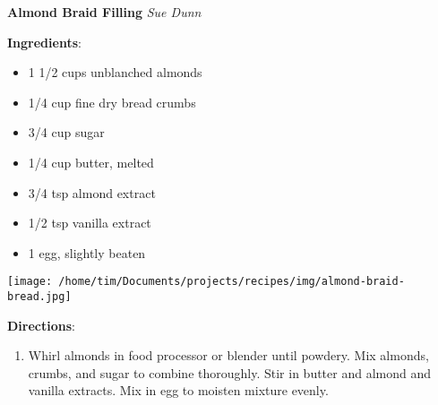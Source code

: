 \documentclass[11pt, twoside, openany]{book}
\begin{document}
\noindent\begin{minipage}[t]{\linewidth}%
{\Large\textbf{Almond Braid Filling}} \label{almond-braid-filling}\hfill\textit{Sue Dunn}\\
\noindent\begin{minipage}[t]{0.78\linewidth}%
\textbf{Ingredients}:\vspace{-3mm}
\begin{multicols}{2}
\begin{itemize}\setlength\itemsep{-1mm}
\item 1 1/2 cups unblanched almonds
\item 1/4 cup fine dry bread crumbs
\item 3/4 cup sugar
\item 1/4 cup butter, melted
\item 3/4 tsp almond extract
\item 1/2 tsp vanilla extract
\item 1 egg, slightly beaten
\end{itemize}
\end{multicols}
\end{minipage}
\noindent\begin{minipage}[t]{0.18\linewidth}
\centering \strut\vspace*{-\baselineskip}\newline
\texttt{[image: /home/tim/Documents/projects/recipes/img/almond-braid-bread.jpg]}\\
\end{minipage}\vspace{3mm}
\textbf{Directions}:
\vspace{-3mm}\begin{enumerate}\setlength\itemsep{-1mm}
\item Whirl almonds in food processor or blender until powdery. Mix almonds, crumbs, and sugar to combine thoroughly. Stir in butter and almond and vanilla extracts. Mix in egg to moisten mixture evenly.
\end{enumerate}
\end{minipage}\vspace{8mm}
\end{document}
